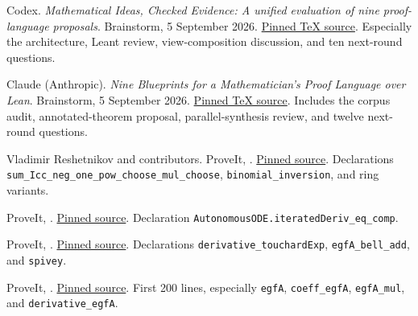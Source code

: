\documentclass[11pt,a4paper]{article}
\newcommand{\code}[1]{\nolinkurl{#1}}
\newcommand{\source}[2]{\href{#1}{#2}}
\theoremstyle{definition}
\begin{document}
\clearpage
{}
{}
\begin{thebibliography}{99}
\small\raggedright
{}
Codex. \emph{Mathematical Ideas, Checked Evidence: A unified evaluation of nine
proof-language proposals}. Brainstorm, 5 September 2026.
\source{https://github.com/VladimirReshetnikov/Brainstorm/blob/494be9d5ab41a5ae219fc6f800e6aee3c93bce39/docs/synthesis/unified-report.tex}{Pinned TeX source}.
Especially the architecture, Leant review, view-composition discussion, and ten
next-round questions.

Claude (Anthropic). \emph{Nine Blueprints for a Mathematician's Proof Language
over Lean}. Brainstorm, 5 September 2026.
\source{https://github.com/VladimirReshetnikov/Brainstorm/blob/494be9d5ab41a5ae219fc6f800e6aee3c93bce39/docs/unified_report/unified_report.tex}{Pinned TeX source}.
Includes the corpus audit, annotated-theorem proposal, parallel-synthesis review,
and twelve next-round questions.

Vladimir Reshetnikov and contributors. ProveIt,
.
\source{https://github.com/VladimirReshetnikov/ProveIt/blob/24ce8bd743eaab64a91ce90725ea00f498d319d2/Analysis/FabiusFunction/Lean/FabiusFunction/BinomialInversion.lean}{Pinned source}.
Declarations \code{sum_Icc_neg_one_pow_choose_mul_choose},
\code{binomial_inversion}, and ring variants.

ProveIt,
.
\source{https://github.com/VladimirReshetnikov/ProveIt/blob/24ce8bd743eaab64a91ce90725ea00f498d319d2/Analysis/FabiusFunction/Lean/FabiusFunction/AutonomousIteratedDeriv.lean}{Pinned source}.
Declaration \code{AutonomousODE.iteratedDeriv_eq_comp}.

ProveIt,
.
\source{https://github.com/VladimirReshetnikov/ProveIt/blob/24ce8bd743eaab64a91ce90725ea00f498d319d2/Analysis/FabiusFunction/Lean/FabiusFunction/BellShiftEGF.lean}{Pinned source}.
Declarations \code{derivative_touchardExp}, \code{egfA_bell_add}, and \code{spivey}.

ProveIt,
.
\source{https://github.com/VladimirReshetnikov/ProveIt/blob/24ce8bd743eaab64a91ce90725ea00f498d319d2/Analysis/FabiusFunction/Lean/FabiusFunction/BellGeneratingFunctions.lean}{Pinned source}.
First 200 lines, especially \code{egfA}, \code{coeff_egfA}, \code{egfA_mul}, and
\code{derivative_egfA}.


\end{thebibliography}
\end{document}
